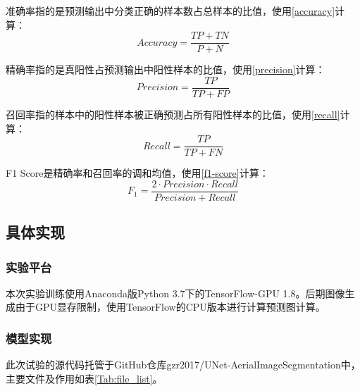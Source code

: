 准确率指的是预测输出中分类正确的样本数占总样本的比值，使用\ref{accuracy}计算：
\begin{equation}\label{accuracy}
    Accuracy=\frac{TP+TN}{P+N}
\end{equation}

精确率指的是真阳性占预测输出中阳性样本的比值，使用\ref{precision}计算：
\begin{equation}\label{precision}
    Precision=\frac{TP}{TP+FP}
\end{equation}

召回率指的样本中的阳性样本被正确预测占所有阳性样本的比值，使用\ref{recall}计算：
\begin{equation}\label{recall}
    Recall=\frac{TP}{TP+FN}
\end{equation}

F1 Score是精确率和召回率的调和均值，使用\ref{f1-score}计算：
\begin{equation}\label{f1-score}
    F_1=\frac{2\cdot Precision\cdot Recall}{Precision+Recall}
\end{equation}
\subsection{具体实现}
\subsubsection{实验平台}
本次实验训练使用Anaconda版Python 3.7下的TensorFlow-GPU 1.8。后期图像生成由于GPU显存限制，使用TensorFlow的CPU版本进行计算预测图计算。
\subsubsection{模型实现}
此次试验的源代码托管于GitHub仓库gzr2017/UNet-AerialImageSegmentation中，主要文件及作用如表\ref{Tab:file_list}。
\begin{table}[htbp]
    \centering
    \caption{文件列表}
    \label{Tab:file_list}
    
\end{table}
